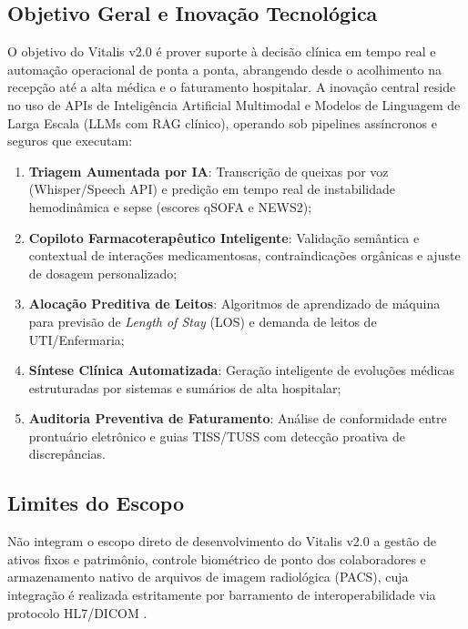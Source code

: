 \documentclass[12pt,oneside,a4paper,article]{abntex2}
\begin{document}
\subsection{Objetivo Geral e Inovação Tecnológica}
O objetivo do Vitalis v2.0 é prover suporte à decisão clínica em tempo real e automação operacional de ponta a ponta, abrangendo desde o acolhimento na recepção até a alta médica e o faturamento hospitalar. A inovação central reside no uso de APIs de Inteligência Artificial Multimodal e Modelos de Linguagem de Larga Escala (LLMs com RAG clínico), operando sob pipelines assíncronos e seguros que executam:
\begin{enumerate}[noitemsep]
  \item \textbf{Triagem Aumentada por IA}: Transcrição de queixas por voz (Whisper/Speech API) e predição em tempo real de instabilidade hemodinâmica e sepse (escores qSOFA e NEWS2);
  \item \textbf{Copiloto Farmacoterapêutico Inteligente}: Validação semântica e contextual de interações medicamentosas, contraindicações orgânicas e ajuste de dosagem personalizado;
  \item \textbf{Alocação Preditiva de Leitos}: Algoritmos de aprendizado de máquina para previsão de \textit{Length of Stay} (LOS) e demanda de leitos de UTI/Enfermaria;
  \item \textbf{Síntese Clínica Automatizada}: Geração inteligente de evoluções médicas estruturadas por sistemas e sumários de alta hospitalar;
  \item \textbf{Auditoria Preventiva de Faturamento}: Análise de conformidade entre prontuário eletrônico e guias TISS/TUSS com detecção proativa de discrepâncias.
\end{enumerate}
\subsection{Limites do Escopo}
Não integram o escopo direto de desenvolvimento do Vitalis v2.0 a gestão de ativos fixos e patrimônio, controle biométrico de ponto dos colaboradores e armazenamento nativo de arquivos de imagem radiológica (PACS), cuja integração é realizada estritamente por barramento de interoperabilidade via protocolo HL7/DICOM \cite{hl7_fhir:2019}.
\end{document}
